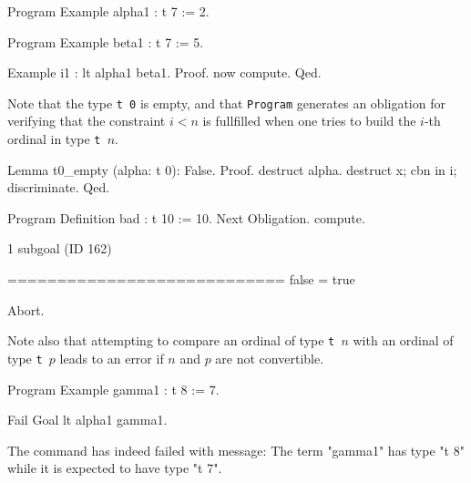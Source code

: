 
\begin{Coqsrc}
Program Example alpha1 : t 7 := 2.

Program Example beta1 : t 7 := 5.

Example i1 : lt  alpha1 beta1.
Proof.   now compute. Qed.
\end{Coqsrc}




Note that the type \texttt{t 0} is empty, and that \texttt{Program} generates an obligation
for verifying that the constraint $i<n$ is fullfilled when one tries to build the $i$-th ordinal in type \texttt{t $n$}.

\begin{Coqsrc}
Lemma t0_empty (alpha: t 0): False.
Proof.
  destruct alpha.
  destruct x; cbn in i; discriminate.
Qed.


Program Definition bad : t 10 := 10.
Next Obligation.
  compute.
\end{Coqsrc}

\begin{Coqanswer}
1 subgoal (ID 162)
  
  ============================
  false = true
\end{Coqanswer}

\begin{Coqsrc}
Abort.
\end{Coqsrc}

Note also that attempting to compare an ordinal of type \texttt{t $n$}  with an ordinal of
type \texttt{t $p$}  leads to an error if $n$ and $p$ are not convertible.

\begin{Coqsrc}

Program Example gamma1 : t 8 := 7.

Fail Goal lt alpha1 gamma1.
\end{Coqsrc}

\begin{Coqanswer}
 The command has indeed failed with message:
The term "gamma1" has type "t 8" while it is expected to have type "t 7".
\end{Coqanswer}


